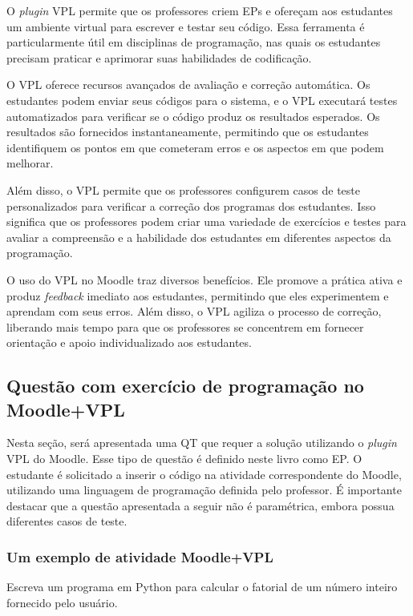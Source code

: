 O \textit{plugin} VPL permite que os professores criem EPs e ofereçam aos estudantes um ambiente virtual para escrever e testar seu código. Essa ferramenta é particularmente útil em disciplinas de programação, nas quais os estudantes precisam praticar e aprimorar suas habilidades de codificação.

O VPL oferece recursos avançados de avaliação e correção automática. Os estudantes podem enviar seus códigos para o sistema, e o VPL executará testes automatizados para verificar se o código produz os resultados esperados. Os resultados são fornecidos instantaneamente, permitindo que os estudantes identifiquem os pontos em que cometeram erros e os aspectos em que podem melhorar.



Além disso, o VPL permite que os professores configurem casos de teste personalizados para verificar a correção dos programas dos estudantes. Isso significa que os professores podem criar uma variedade de exercícios e testes para avaliar a compreensão e a habilidade dos estudantes em diferentes aspectos da programação.

O uso do VPL no Moodle traz diversos benefícios. Ele promove a prática ativa e produz \textit{feedback} imediato aos estudantes, permitindo que eles experimentem e aprendam com seus erros. Além disso, o VPL agiliza o processo de correção, liberando mais tempo para que os professores se concentrem em fornecer orientação e apoio individualizado aos estudantes.

\subsection{Questão com exercício de programação no Moodle+VPL}

Nesta seção, será apresentada uma QT que requer a solução utilizando o \textit{
plugin} VPL do Moodle. Esse tipo de questão é definido neste livro como EP. O estudante é solicitado a inserir o código na atividade correspondente do Moodle, utilizando uma linguagem de programação definida pelo professor. É importante destacar que a questão apresentada a seguir não é paramétrica, embora possua diferentes casos de teste.

\subsubsection{Um exemplo de atividade Moodle+VPL}

Escreva um programa em Python para calcular o fatorial de um número inteiro fornecido pelo usuário.

